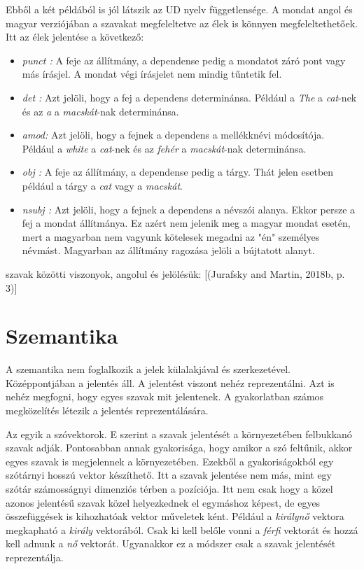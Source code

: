 Ebből a két példából is jól látszik az UD nyelv függetlensége.
A mondat angol és magyar verziójában a szavakat megfeleltetve az élek is könnyen megfeleltethetőek.
Itt az élek jelentése a következő:
\begin{itemize}
\item \emph{punct : } 
A feje az állítmány, a dependense pedig a mondatot záró pont vagy más írásjel.
A mondat végi írásjelet nem mindig tűntetik fel.
\item \emph{det : } 
Azt jelöli, hogy a fej a dependens determinánsa. 
Például a \textit{The} a \textit{cat}-nek és az \textit{a} a \textit{macskát}-nak determinánsa.
\item \emph{amod: } 
Azt jelöli, hogy a fejnek a dependens a mellékknévi módosítója.
Például a \textit{white} a \textit{cat}-nek és az \textit{fehér} a \textit{macskát}-nak determinánsa.
\item \emph{obj : }  
A feje az állítmány, a dependense pedig a tárgy.
Thát jelen esetben például a tárgy a \textit{cat} vagy a \textit{macskát}.
\item \emph{nsubj : } 
Azt jelöli, hogy a fejnek a dependens a névszói alanya. 
Ekkor persze a fej a mondat állítmánya.
Ez azért nem jelenik meg a magyar mondat esetén, mert a magyarban nem vagyunk kötelesek megadni az "én" személyes névmást.
Magyarban az állítmány ragozása jelöli a bújtatott alanyt.
\end{itemize}

szavak közötti viszonyok, angolul és jelölésük:
[(Jurafsky and Martin, 2018b, p. 3)]


\section{Szemantika}

A szemantika nem foglalkozik a jelek külalakjával és szerkezetével.
Középpontjában a jelentés áll.
A jelentést viszont nehéz reprezentálni.
Azt is nehéz megfogni, hogy egyes szavak mit jelentenek.
A gyakorlatban számos megközelítés létezik a jelentés reprezentálására.

Az egyik a szóvektorok.
E szerint a szavak jelentését a környezetében felbukkanó szavak adják.
Pontosabban annak gyakorisága, hogy amikor a szó feltűnik, akkor egyes szavak is megjelennek a környezetében.
Ezekből a gyakoriságokból egy szótárnyi hosszú vektor készíthető.
Itt a szavak jelentése nem más, mint egy szótár számosságnyi dimenziós térben a pozíciója.
Itt nem csak hogy a közel azonos jelentésű szavak közel helyezkednek el egymáshoz képest, de egyes összefüggések is kihozhatóak vektor műveletek ként.
Például a \textit{királynő} vektora megkapható a \textit{király} vektorából.
Csak ki kell belőle vonni a \textit{férfi} vektorát és hozzá kell adnunk a \textit{nő} vektorát.
Ugyanakkor ez a módszer csak a szavak jelentését reprezentálja.
 
